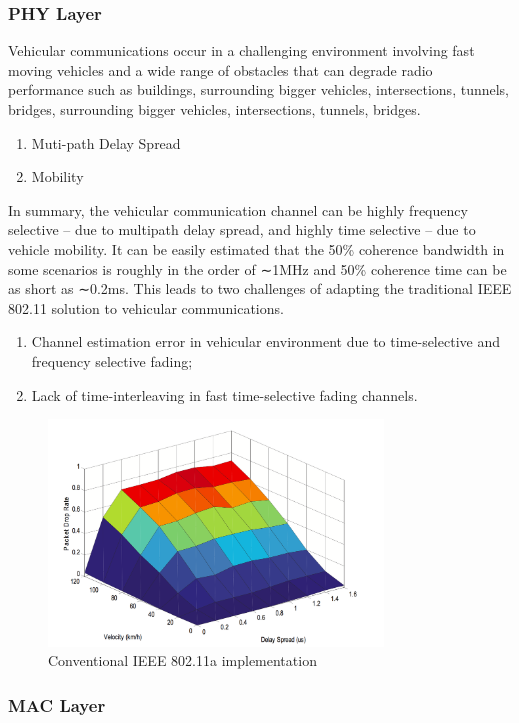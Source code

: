 \documentclass[runningheads,a4paper]{llncs}
\begin{document}
\subsubsection{PHY Layer}
Vehicular communications occur in a challenging environment involving fast moving vehicles and a wide range of obstacles that can degrade radio performance such as buildings, surrounding bigger vehicles, intersections, tunnels, bridges, surrounding bigger vehicles, intersections, tunnels, bridges.\cite{IEEE-2007}
\begin{enumerate}
\item Muti-path Delay Spread

\item Mobility
\end{enumerate}

In summary, the vehicular communication channel can be highly frequency selective – due to multipath delay spread, and highly time selective – due to vehicle mobility. It can be easily estimated that the 50\% coherence bandwidth in some scenarios is roughly in the order of ∼1MHz and 50\% coherence time can be as short as ∼0.2ms. This leads to two challenges of adapting the traditional IEEE 802.11 solution to vehicular communications.\cite{IEEE2013}
\begin{enumerate}
\item Channel estimation error in vehicular environment due to time-selective and frequency selective fading;
\item Lack of time-interleaving in fast time-selective fading channels.
\end{enumerate}

\begin{figure}[thpb] 
	\centering
	\includegraphics[width=3.5in]{V and DS.png}
	\caption{Conventional IEEE 802.11a implementation \cite{IEEE2013}}
	\label{Fig-Channels}
\end{figure}

\subsubsection{MAC Layer}
\end{document}
